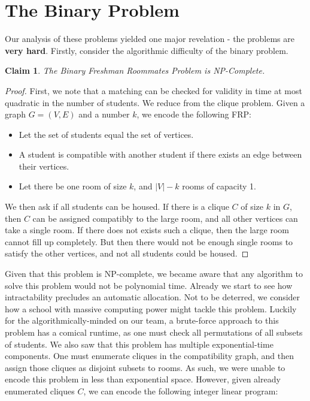 \documentclass[11pt]{article}
\newtheorem*{claim*}{Claim}
\begin{document}
\section*{The Binary Problem}
Our analysis of these problems yielded one major revelation - the problems are \textbf{very hard}. Firstly, consider the algorithmic difficulty of the binary problem.

\begin{claim*}
The Binary Freshman Roommates Problem is NP-Complete.
\end{claim*}

\begin{proof}
First, we note that a matching can be checked for validity in time at most quadratic in the number of students. We reduce from the clique problem. Given a graph $G = (V, E)$ and a number $k$, we encode the following FRP:
\begin{itemize}
\item Let the set of students equal the set of vertices.
\item A student is compatible with another student if there exists an edge between their vertices.
\item Let there be one room of size $k$, and $|V| - k$ rooms of capacity 1.
\end{itemize}
We then ask if all students can be housed. If there is a clique $C$ of size $k$ in $G$, then $C$ can be assigned compatibly to the large room, and all other vertices can take a single room. If there does not exists such a clique, then the large room cannot fill up completely. But then there would not be enough single rooms to satisfy the other vertices, and not all students could be housed. 
\end{proof}

Given that this problem is NP-complete, we became aware that any algorithm to solve this problem would not be polynomial time. Already we start to see how intractability precludes an automatic allocation. Not to be deterred, we consider how a school with massive computing power might tackle this problem. Luckily for the algorithmically-minded on our team, a brute-force approach to this problem has a comical runtime, as one  must check all permutations of all subsets of students. We also saw that this problem has multiple exponential-time components. One must enumerate cliques in the compatibility graph, and then assign those cliques as disjoint subsets to rooms. As such, we were unable to encode this problem in less than exponential space. However, given already enumerated cliques $C$, we can encode the following integer linear program:
\end{document}
